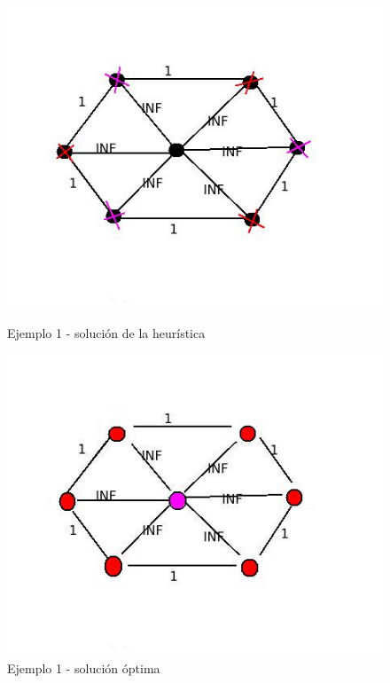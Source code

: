 \documentclass[11pt, a4paper, twoside]{article}
\begin{document}
\begin{enumerate}
\begin{enumerate}
		\begin{figure}[H]
			\begin{minipage}{.6\textwidth}
			\centering
			\includegraphics[width=.8\linewidth]{imagenes/ej3_11}
			\caption{Ejemplo 1 - solución de la heurística}
			\end{minipage}
			\begin{minipage}{.6\textwidth}
			\includegraphics[width=.8\linewidth]{imagenes/ej3_12}
			\caption{Ejemplo 1 - solución óptima}
			\end{minipage}
		\end{figure}
		

\end{enumerate}
\end{enumerate}
\end{document}
